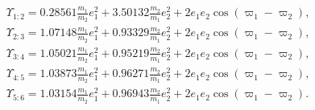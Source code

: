 \documentclass[12pt,a4paper,oneside]{article}
\begin{document}
\begin{equation}
	\begin{split}
		&\Upsilon_{1:2}=0.28561\frac{m_1}{m_2}e_1^2+3.50132\frac{m_2}{m_1}e_2^2+2e_1e_2\cos(\varpi_1-\varpi_2),\\
		&\Upsilon_{2:3}=1.07148\frac{m_1}{m_2}e_1^2+0.93329\frac{m_2}{m_1}e_2^2+2e_1e_2\cos(\varpi_1-\varpi_2),\\
		&\Upsilon_{3:4}=1.05021\frac{m_1}{m_2}e_1^2+0.95219\frac{m_2}{m_1}e_2^2+2e_1e_2\cos(\varpi_1-\varpi_2),\\
		&\Upsilon_{4:5}=1.03873\frac{m_1}{m_2}e_1^2+0.96271\frac{m_2}{m_1}e_2^2+2e_1e_2\cos(\varpi_1-\varpi_2),\\
		&\Upsilon_{5:6}=1.03154\frac{m_1}{m_2}e_1^2+0.96943\frac{m_2}{m_1}e_2^2+2e_1e_2\cos(\varpi_1-\varpi_2).
	\end{split}
\end{equation}


%
%
%
%
%
%
%


\printbibliography[heading=bibintoc]
\end{document}
